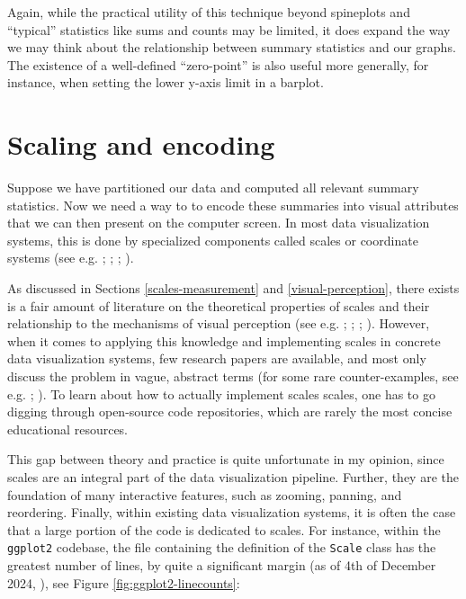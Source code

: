 \documentclass[
]{book}
\theoremstyle{definition}
\theoremstyle{definition}
\theoremstyle{definition}
\theoremstyle{definition}
\theoremstyle{remark}
\begin{document}
Again, while the practical utility of this technique beyond spineplots and ``typical'' statistics like sums and counts may be limited, it does expand the way we may think about the relationship between summary statistics and our graphs. The existence of a well-defined ``zero-point'' is also useful more generally, for instance, when setting the lower y-axis limit in a barplot.

\section{Scaling and encoding}\label{scaling}

Suppose we have partitioned our data and computed all relevant summary statistics. Now we need a way to to encode these summaries into visual attributes that we can then present on the computer screen. In most data visualization systems, this is done by specialized components called scales or coordinate systems (see e.g. ; ; ; ).

As discussed in Sections \ref{scales-measurement} and \ref{visual-perception}, there exists is a fair amount of literature on the theoretical properties of scales and their relationship to the mechanisms of visual perception (see e.g. ; ; ; ). However, when it comes to applying this knowledge and implementing scales in concrete data visualization systems, few research papers are available, and most only discuss the problem in vague, abstract terms (for some rare counter-examples, see e.g. ; ). To learn about how to actually implement scales scales, one has to go digging through open-source code repositories, which are rarely the most concise educational resources.

This gap between theory and practice is quite unfortunate in my opinion, since scales are an integral part of the data visualization pipeline. Further, they are the foundation of many interactive features, such as zooming, panning, and reordering. Finally, within existing data visualization systems, it is often the case that a large portion of the code is dedicated to scales. For instance, within the \texttt{ggplot2} codebase, the file containing the definition of the \texttt{Scale} class has the greatest number of lines, by quite a significant margin (as of 4th of December 2024, ), see Figure \ref{fig:ggplot2-linecounts}:
\end{document}
